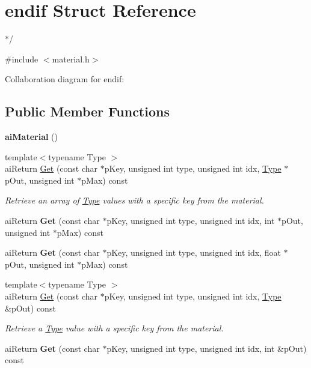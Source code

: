 \hypertarget{structendif}{\section{endif Struct Reference}
\label{structendif}
}


$\ast$/  




{\ttfamily \#include $<$material.\+h$>$}



Collaboration diagram for endif\+:
\subsection*{Public Member Functions}
\begin{DoxyCompactItemize}
\item 
\hypertarget{structendif_aecfb322023b3a31eb28c53ddb5fe5cb3}{{\bfseries ai\+Material} ()}\label{structendif_aecfb322023b3a31eb28c53ddb5fe5cb3}

\item 
{\footnotesize template$<$typename Type $>$ }\\ai\+Return \hyperlink{structendif_a4b08154b44a2676d0664547b6475aa0b}{Get} (const char $\ast$p\+Key, unsigned int type, unsigned int idx, \hyperlink{struct_type}{Type} $\ast$p\+Out, unsigned int $\ast$p\+Max) const 
\begin{DoxyCompactList}\small\item\em Retrieve an array of \hyperlink{struct_type}{Type} values with a specific key from the material. \end{DoxyCompactList}\item 
\hypertarget{structendif_a5f7f7f17939445e46d4b627a94e6f3e8}{ai\+Return {\bfseries Get} (const char $\ast$p\+Key, unsigned int type, unsigned int idx, int $\ast$p\+Out, unsigned int $\ast$p\+Max) const }\label{structendif_a5f7f7f17939445e46d4b627a94e6f3e8}

\item 
\hypertarget{structendif_a3025cbc4b9b9ab1a2d576226c88b9580}{ai\+Return {\bfseries Get} (const char $\ast$p\+Key, unsigned int type, unsigned int idx, float $\ast$p\+Out, unsigned int $\ast$p\+Max) const }\label{structendif_a3025cbc4b9b9ab1a2d576226c88b9580}

\item 
{\footnotesize template$<$typename Type $>$ }\\ai\+Return \hyperlink{structendif_aaa5e921648171c5d4a9f195030c17883}{Get} (const char $\ast$p\+Key, unsigned int type, unsigned int idx, \hyperlink{struct_type}{Type} \&p\+Out) const 
\begin{DoxyCompactList}\small\item\em Retrieve a \hyperlink{struct_type}{Type} value with a specific key from the material. \end{DoxyCompactList}\item 
\hypertarget{structendif_a178f108e6bd7afef988a043e70f29cdf}{ai\+Return {\bfseries Get} (const char $\ast$p\+Key, unsigned int type, unsigned int idx, int \&p\+Out) const }\label{structendif_a178f108e6bd7afef988a043e70f29cdf}


\end{DoxyCompactItemize}
